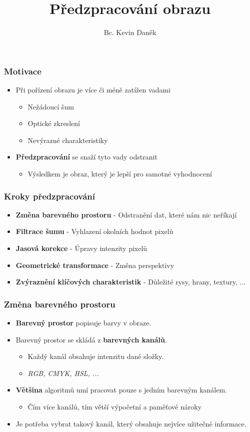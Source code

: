 \documentclass[FM]{tulpresentation}
\title{Předzpracování obrazu}
\author{Bc. Kevin Daněk}
\begin{document}
	
	\TULtitleframe
	
	\begin{frame}
		\frametitle{Motivace}
	    \begin{itemize}
	      \item Při pořízení obrazu je více či méně zatížen vadami
	      \begin{itemize}
	      	\item Nežádoucí šum
	      	\item Optické zkreslení
	      	\item Nevýrazné charakteristiky
	      \end{itemize}
	      \item \textbf{Předzpracování} se snaží tyto vady odstranit
	      \begin{itemize}
	      	\item Výsledkem je obraz, který je lepší pro samotné vyhodnocení
	      \end{itemize}
	    \end{itemize}
	\end{frame}
	
	\begin{frame}
		\frametitle{Kroky předzpracování}
		\begin{itemize}
			\item \textbf{Změna barevného prostoru} - Odstranění dat, které nám nic neříkají
			\item \textbf{Filtrace šumu} - Vyhlazení okolních hodnot pixelů
			\item \textbf{Jasová korekce} - Úpravy intenzity pixelů
			\item \textbf{Geometrické transformace} - Změna perspektivy
			\item \textbf{Zvýraznění klíčových charakteristik} - Důležité rysy, hrany, textury, ...
		\end{itemize}
	\end{frame}
	
	\begin{frame}
		\frametitle{Změna barevného prostoru}
		\begin{itemize}
			\item \textbf{Barevný prostor} popisuje barvy v obraze.
			\item Barevný prostor se skládá z \textbf{barevných kanálů}.
			\begin{itemize}
				\item Každý kanál obsahuje intenzitu dané složky.
				\item \textit{RGB, CMYK, HSL, ...}
			\end{itemize}
			\item \textbf{Většina} algoritmů umí pracovat pouze s jedním barevným kanálem.
			\begin{itemize}
				\item Čím více kanálů, tím větší výpočetní a paměťové nároky
			\end{itemize}
			\item Je potřeba vybrat takový kanál, který obsahuje nejvíce užitečné informace.
		\end{itemize}
	\end{frame}
	
\end{document}
